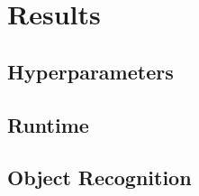 \chapter{Results}\label{chapter:results}
\section{Hyperparameters}
\section{Runtime}
\section{Object Recognition}
